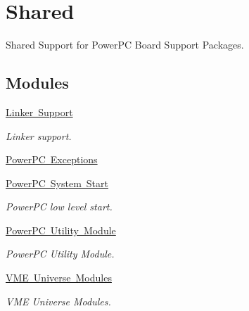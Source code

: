 \hypertarget{group__RTEMSBSPsPowerPCShared}{}\section{Shared}
\label{group__RTEMSBSPsPowerPCShared}


Shared Support for Power\+PC Board Support Packages.  


\subsection*{Modules}
\begin{DoxyCompactItemize}
\item 
\mbox{\hyperlink{group__RTEMSBSPsPowerPCSharedLinker}{Linker Support}}
\begin{DoxyCompactList}\small\item\em Linker support. \end{DoxyCompactList}\item 
\mbox{\hyperlink{group__ppc__exc}{Power\+P\+C Exceptions}}
\item 
\mbox{\hyperlink{group__RTEMSBSPsPowerPCSharedStart}{Power\+P\+C System Start}}
\begin{DoxyCompactList}\small\item\em Power\+PC low level start. \end{DoxyCompactList}\item 
\mbox{\hyperlink{group__RTEMSBSPsPowerPCSharedUtility}{Power\+P\+C Utility Module}}
\begin{DoxyCompactList}\small\item\em Power\+PC Utility Module. \end{DoxyCompactList}\item 
\mbox{\hyperlink{group__shared__vmeuniverse}{V\+M\+E Universe Modules}}
\begin{DoxyCompactList}\small\item\em V\+ME Universe Modules. \end{DoxyCompactList}\end{DoxyCompactItemize}
